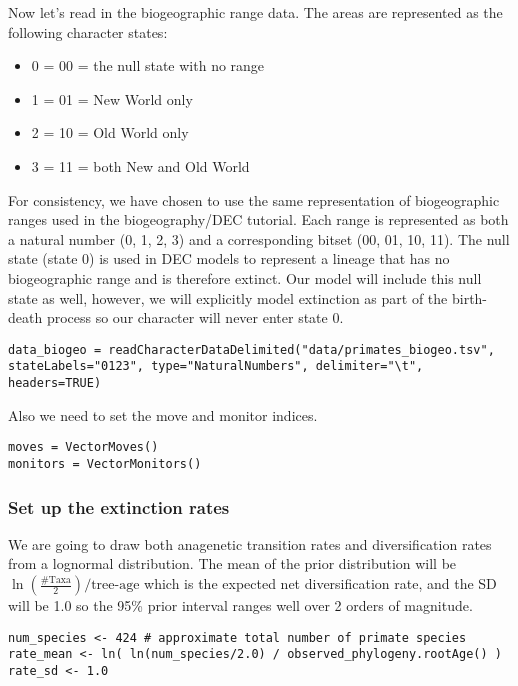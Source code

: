 Now let's read in the biogeographic range data. The areas are represented as the following character states:
\begin{itemize}
\item 0 = 00 = the null state with no range
\item 1 = 01 = New World only
\item 2 = 10 = Old World only
\item 3 = 11 = both New and Old World
\end{itemize}
For consistency, we have chosen to use the same representation of biogeographic ranges used in the \RevBayes biogeography/DEC tutorial.
Each range is represented as both a natural number (0, 1, 2, 3) and a corresponding bitset (00, 01, 10, 11).
The null state (state 0) is used in DEC models to represent a lineage that has no biogeographic range and is therefore extinct.
Our model will include this null state as well, however, we will explicitly model extinction as part of the birth-death
process so our character will never enter state 0.
{\tt \begin{snugshade*}
\begin{lstlisting}
data_biogeo = readCharacterDataDelimited("data/primates_biogeo.tsv", stateLabels="0123", type="NaturalNumbers", delimiter="\t", headers=TRUE)
\end{lstlisting}
\end{snugshade*}}

Also we need to set the move and monitor indices.
{\tt \begin{snugshade*}
\begin{lstlisting}
moves = VectorMoves()
monitors = VectorMonitors()
\end{lstlisting}
\end{snugshade*}}

\subsubsection{Set up the extinction rates}

We are going to draw both anagenetic transition rates
and diversification rates from a lognormal distribution.
The mean of the prior distribution will be 
$\ln(\frac{\text{\#Taxa}}{2}) / \text{tree-age}$
which is the expected net 
diversification rate, and the SD will be 1.0 so the 95\% 
prior interval ranges well over 2 orders of magnitude.
{\tt \begin{snugshade*}
\begin{lstlisting}
num_species <- 424 # approximate total number of primate species
rate_mean <- ln( ln(num_species/2.0) / observed_phylogeny.rootAge() )
rate_sd <- 1.0
\end{lstlisting}
\end{snugshade*}}

